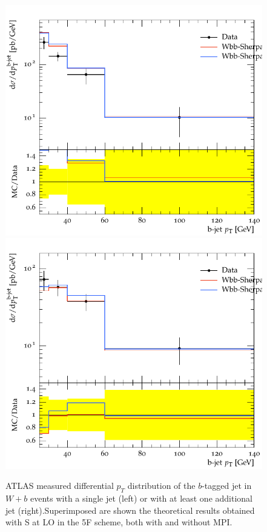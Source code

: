 \documentclass[11pt]{cernrep}
\newcommand{\Sherpa}{S\protect\scalebox{0.8}{HERPA}\xspace}
\newcommand{\pt}{\ensuremath{p_{T}}\xspace}
\begin{document}
\begin{figure}[htbp]
\begin{center}
   \includegraphics[scale=0.65]{figs/wbb/sherpa/d02-x01-y02.pdf}
   \includegraphics[scale=0.65]{figs/wbb/sherpa/d02-x02-y02.pdf}
\end{center}
\caption{ATLAS measured differential \pt distribution of the $b$-tagged jet in $W+b$ events with a
  single jet (left) or with at least one additional jet
  (right).Superimposed are shown the theoretical results obtained with
  \Sherpa at LO in the 5F scheme, both with and without MPI.}
\label{fig:wbb-pt-sherpa}
\end{figure}
\end{document}
